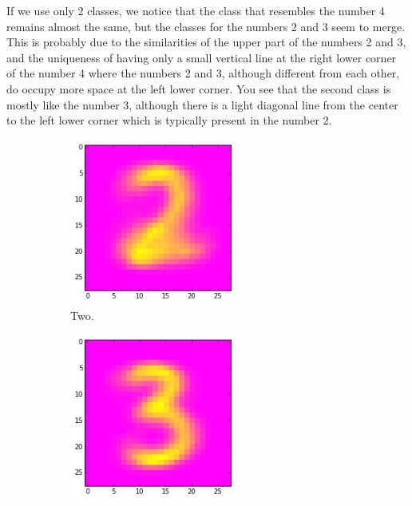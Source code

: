 \documentclass[a4paper,10pt]{article}
\numberwithin{equation}{section} %
\numberwithin{figure}{section} %
\numberwithin{table}{section} %
\theoremstyle{mytheor}
\begin{document}
\begin{enumerate}
		If we use only 2 classes, we notice that the class that resembles the number 4 remains almost the same, but the classes for the numbers 2 and 3 seem to merge. This is probably due to the similarities of the upper part of the numbers 2 and 3, and the uniqueness of having only a small vertical line at the right lower corner of the number 4 where the numbers 2 and 3, although different from each other, do occupy more space at the left lower corner. You see that the second class is mostly like the number 3, although there is a light diagonal line from the center to the left lower corner which is typically present in the number 2.
		\begin{figure}[h]
			\centering
			\begin{subfigure}[b]{0.24\textwidth}
				\centering
				\includegraphics[width=0.6\textwidth]{digits/true2.png}\vspace{-0.4cm}
				\caption{Two.}
			\end{subfigure}
			\begin{subfigure}[b]{0.24\textwidth}
				\centering
				\includegraphics[width=0.6\textwidth]{digits/true3.png}\vspace{-0.4cm}

\end{subfigure}
\end{figure}
\end{enumerate}
\end{document}
